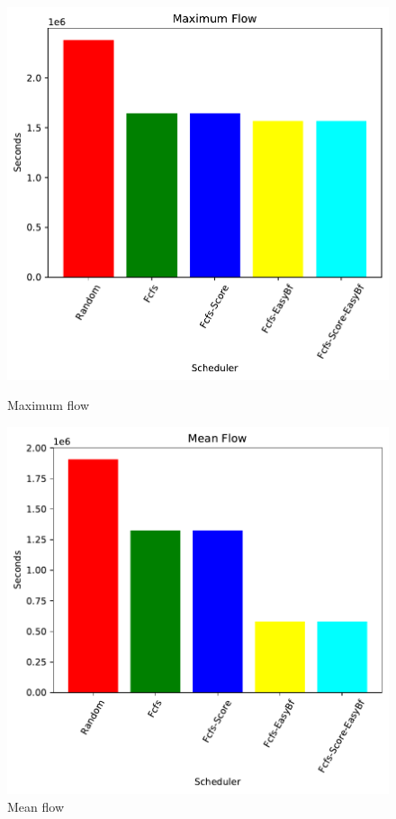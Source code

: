 \documentclass[a4paper]{article}
\begin{document}
	\begin{figure}[H]
	\begin{minipage}[b]{0.5\linewidth}\centering\includegraphics[width=1.11\linewidth]{MBSS/plot/2021-05-23-800_Maximum_flow.pdf}\caption{Maximum flow}\vspace{4ex}\end{minipage}
	\begin{minipage}[b]{0.5\linewidth}\centering\includegraphics[width=1.11\linewidth]{MBSS/plot/2021-05-23-800_Mean_flow.pdf}\caption{Mean flow}\vspace{4ex}\end{minipage} 

\end{figure}
\end{document}
